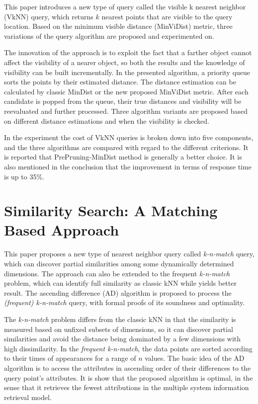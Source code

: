 \documentclass[paper=a4, fontsize=18pt]{article} %
\numberwithin{equation}{section} %
\numberwithin{figure}{section} %
\numberwithin{table}{section} %
\begin{document}
This paper introduces a new type of query called the visible k nearest neighbor (VkNN) query, which returns $k$ nearest points that are visible to the query location. Based on the minimum visible distance (MinViDist) metric, three variations of the query algorithm are proposed and experimented on.

The innovation of the approach is to exploit the fact that a farther object cannot affect the visibility of a nearer object, so both the results and the knowledge of visibility can be built incrementally. In the presented algorithm, a priority queue sorts the points by their estimated distance. The distance estimation can be calculated by classic MinDist or the new proposed MinViDist metric. After each candidate is popped from the queue, their true distances and visibility will be reevaluated and further processed. Three algorithm variants are proposed based on different distance estimations and when the visibility is checked.

In the experiment the cost of VkNN queries is broken down into five components, and the three algorithms are compared with regard to the different criterions. It is reported that PrePruning-MinDist method is generally a better choice. It is also mentioned in the conclusion that the improvement in terms of response time is up to 35\%.

\section{Similarity Search: A Matching Based Approach \cite{TZKO06}}

This paper proposes a new type of nearest neighbor query called \emph{k-n-match} query, which can discover partial similarities among some dynamically determined dimensions. The approach can also be extended to the frequent \emph{k-n-match} problem, which can identify full similarity as classic kNN while yields better result. The ascending difference (AD) algorithm is proposed to process the \emph{(frequent) k-n-match} query, with formal proofs of its soundness and optimality.

The \emph{k-n-match} problem differs from the classic kNN in that the similarity is measured based on unfixed subsets of dimensions, so it can discover partial similarities and avoid the distance being dominated by a few dimensions with high dissimilarity. In the \emph{frequent k-n-match}, the data points are sorted according to their times of appearances for a range of $n$ values. The basic idea of the AD algorithm is to access the attributes in ascending order of their differences to the query point's attributes. It is show that the proposed algorithm is optimal, in the sense that it retrieves the fewest attributions in the multiple system information retrieval model.
\end{document}
